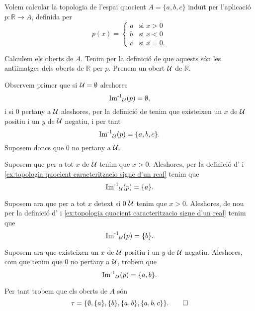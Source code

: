 \documentclass[../Apunts.tex]{subfiles}
\begin{document}
	\begin{example}
		Volem calcular la topologia de l'espai quocient \(A=\{a,b,c\}\) induït per l'aplicació \(p\colon\mathbb{R}\longrightarrow A\), definida per
		\begin{equation}
			\label{ex:topologia quocient caracteritzacio signe d'un real}
			p(x)=\begin{cases}
				a & \text{si }x>0 \\
				b & \text{si }x<0 \\
				c & \text{si }x=0.
			\end{cases}
		\end{equation}
		\begin{solution}
			Calculem els oberts de \(A\). Tenim per la definició de  que aquests són les antiimatges dels oberts de \(\mathbb{R}\) per \(p\). Prenem un obert \(\mathcal{U}\) de \(\mathbb{R}\).
			
			Observem primer que si \(\mathcal{U}=\emptyset\) aleshores
			\[\operatorname{\operatorname{Im}^{-1}}_{\mathcal{U}}(p)=\emptyset,\]
			i si \(0\) pertany a \(\mathcal{U}\) aleshores, per la definició de  tenim que existeixen un \(x\) de \(\mathcal{U}\) positiu i un \(y\) de \(\mathcal{U}\) negatiu, i per tant
			\[\operatorname{\operatorname{Im}^{-1}}_{\mathcal{U}}(p)=\{a,b,c\}.\]
			Suposem doncs que \(0\) no pertany a \(\mathcal{U}\).
			
			Suposem que per a tot \(x\) de \(\mathcal{U}\) tenim que \(x>0\). Aleshores, per la definició d' i \eqref{ex:topologia quocient caracteritzacio signe d'un real} tenim que
			\[\operatorname{\operatorname{Im}^{-1}}_{\mathcal{U}}(p)=\{a\}.\]
			
			Suposem ara que per a tot \(x\) detext{ si }0 \(\mathcal{U}\) tenim que \(x>0\). Aleshores, de nou per la definició d' i \eqref{ex:topologia quocient caracteritzacio signe d'un real} tenim que
			\[\operatorname{\operatorname{Im}^{-1}}_{\mathcal{U}}(p)=\{b\}.\]
			
			Suposem ara que existeixen un \(x\) de \(\mathcal{U}\) positiu i un \(y\) de \(\mathcal{U}\) negatiu. Aleshores, com que tenim que \(0\) no pertany a \(\mathcal{U}\), trobem que
			\[\operatorname{\operatorname{Im}^{-1}}_{\mathcal{U}}(p)=\{a,b\}.\]
			
			Per tant trobem que els oberts de \(A\) són
			\[\tau=\{\emptyset,\{a\},\{b\},\{a,b\},\{a,b,c\}\}.\qedhere\]
		\end{solution}
	\end{example}
\end{document}
